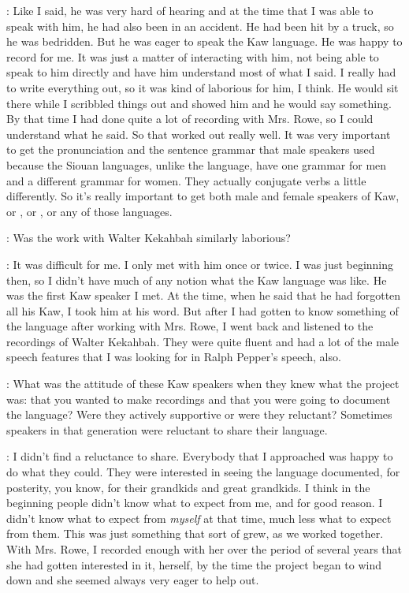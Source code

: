 \documentclass[output=paper]{LSP/langsci}
\begin{document}
: Like I said, he was very hard of hearing and at the time that I was able to speak with him, he had also been in an accident. He had been hit by a truck, so he was bedridden. But he was eager to speak the Kaw language. He was happy to record for me. It was just a matter of interacting with him, not being able to speak to him directly and have him understand most of what I said. I really had to write everything out, so it was kind of laborious for him, I think. He would sit there while I scribbled things out and showed him and he would say something. By that time I had done quite a lot of recording with Mrs. Rowe, so I could understand what he said. So that worked out really well. It was very important to get the pronunciation and the sentence grammar that male speakers used because the Siouan languages, unlike the  language, have one grammar for men and a different grammar for women. They actually conjugate verbs a little differently. So it's really important to get both male and female speakers of Kaw, or , or , or  any of those languages.

: Was the work with Walter Kekahbah similarly laborious?

: It was difficult for me. I only met with him once or twice. I was just beginning then, so I didn't have much of any notion what the Kaw language was like. He was the first Kaw speaker I met. At the time, when he said that he had forgotten all his Kaw, I took him at his word. But after I had gotten to know something of the language after working with Mrs. Rowe, I went back and listened to the recordings of Walter Kekahbah. They were quite fluent and had a lot of the male speech features that I was looking for in Ralph Pepper's speech, also.

: What was the attitude of these Kaw speakers when they knew what the project was: that you wanted to make recordings and that you were going to document the language? Were they actively supportive or were they reluctant? Sometimes speakers in that generation were reluctant to share their language.

: I didn't find a reluctance to share. Everybody that I approached was happy to do what they could. They were interested in seeing the language documented, for posterity, you know, for their grandkids and great grandkids. I think in the beginning people didn't know what to expect from me, and for good reason. I didn't know what to expect from \textit{myself} at that time, much less what to expect from them. This was just something that sort of grew, as we worked together. With Mrs. Rowe, I recorded enough with her over the period of several years that she had gotten interested in it, herself, by the time the project began to wind down and she seemed always very eager to help out.
\end{document}
